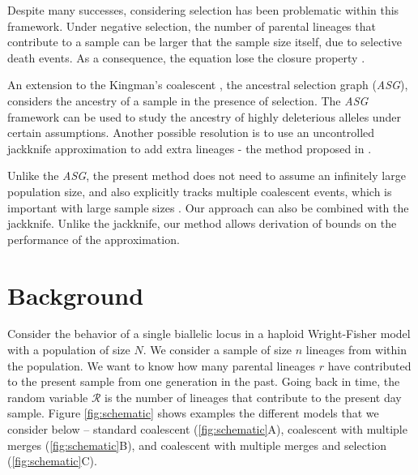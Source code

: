 \documentclass[review]{elsarticle}
\begin{document}
Despite many successes, considering selection has been problematic within this framework. Under
negative selection, the number of parental lineages that contribute to a sample can be larger that
the sample size itself, due to selective death events. As a consequence, the equation lose the
closure property \citep{JouganousEtAl2017}.

An extension to the Kingman's coalescent \citep{Kingman1982a}, the ancestral selection graph
(\textit{ASG}), \citep{KroneNeuhauser1997} considers the ancestry of a sample in the presence of
selection. The \textit{ASG} framework can be used to study the ancestry of highly deleterious
alleles \citep{Wakeley2009} under certain assumptions. Another possible resolution is to use an
uncontrolled jackknife approximation to add extra lineages - the method proposed in
\citep{JouganousEtAl2017}.

Unlike the \textit{ASG}, the present method does not need to assume an infinitely large population
size, and also explicitly tracks multiple coalescent events, which is important with large sample
sizes \citep{BhaskarEtAl2014}. Our approach can also be combined with the jackknife. Unlike the
jackknife, our method allows derivation of bounds on the performance of the approximation.

\section{Background}
\label{sec:background}

Consider the behavior of a single biallelic locus in a haploid Wright-Fisher model with a population
of size $N$. We consider a sample of size $n$ lineages from within the population. We want to know
how many parental lineages $r$ have contributed to the present sample from one generation in the
past. Going back in time, the random variable $\mathcal{R}$ is the number of lineages that
contribute to the present day sample. Figure \ref{fig:schematic} shows examples the different models
that we consider below -- standard coalescent (\ref{fig:schematic}A), coalescent with multiple
merges (\ref{fig:schematic}B), and coalescent with multiple merges and selection
(\ref{fig:schematic}C).
\end{document}
